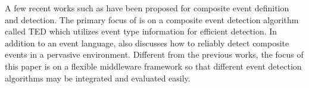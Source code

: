 A few recent works such as \cite{lai:ted} \cite{complexevent} have been proposed for composite event definition and detection. The primary focus of \cite{lai:ted} is on a composite event detection algorithm called TED which utilizes event type information for efficient detection. In addition to an event language, \cite{complexevent} also discusses how to reliably detect composite events in a pervasive environment. Different from the previous works, the focus of this paper is on a flexible middleware framework so that different event detection algorithms may be integrated and evaluated easily.

\begin{comment}
\subsection{Composite Event Detection}
If we take the event relations into consideration while detecting the events, then detection can be done with different strategies. In this paper, we mainly consider message cost as event detection cost. Furthermore, since primitive event can be detected by individual sensor nodes, we mainly consider the composite event detection cost in this paper.

In general, if a composite event is detected based on two sub-events \(e_1\) and \(e_2\) as shown in Figure \ref{fig:event-detection2} then the cost for detecting the composite event will be the cost for detecting each individual events together with the cost for delivering the event detection results to the event detector. An event detector here is simply a node responsible for detecting composite events.

\begin{figure}
\centering
\subfloat[Basic composite event detection]{\label{fig:event-detection2}\figurehalfwidth{event-detection2}}
\subfloat[Composite event detection using event probability]{\label{fig:event-detection3}\figurehalfwidth{event-detection3}}
\caption{Composite event detection}
\label{fig:event-detection}
\end{figure}

Sometimes the events may have dependency and certain events must happen before others. In this case, we don't need to make all sensor nodes monitor the events at all the time. Instead, some nodes may firstly put to sleep mode and then be waken up when other events occur. For example, as shown in Figure \ref{fig:event-detection3}, if we have two events \(e_1\) and \(e_2\) which have a relation such that the composite event happens only when both events have been successfully detected. If \(e_2\) and \(e_1\) need to satisfy a relation such that \(e_2\) happens after \(e_1\). Then originally the nodes responsible for monitoring \(e_2\) may be put to sleep mode. After \(e_1\) has successfully been detected, a message can be forwarded to the nodes responsible for detecting \(e_2\) and wake them up. In this way, we can further reduce the energy cost because \(e_2\) doesn't have to be monitored if \(e_1\) doesn't occur.
\end{comment}

